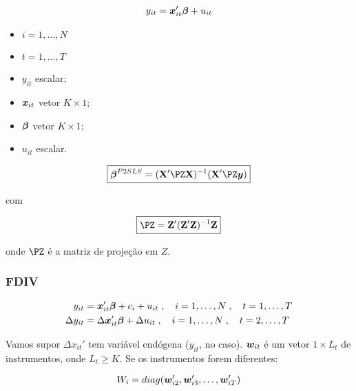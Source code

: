 \documentclass[11pt, oneside, a4paper, article]{article}
\numberwithin{equation}{section}
\begin{document}
\begin{description}
\vspace{-1 em}
\begin{align*}
y_{it} = \boldsymbol{x}_{it}' \boldsymbol{\beta} + u_{it}
\end{align*}

\begin{itemize}\itemsep0pt
\item $i = 1, \dots, N$
\item $t = 1, \dots, T$
\item $y_{it}$ escalar;
\item $\boldsymbol{x}_{it}$  vetor $K \times 1$;
\item $\boldsymbol{\beta}$ vetor $K \times 1$;
\item $u_{it}$ escalar.
\end{itemize}

\vspace{-1 em}
\begin{align*}
\boxed{
\betavec^{P2SLS} =  ( \Xmat' \PZ \Xmat )^{-1} ( \Xmat' \PZ \yvec ) }
\end{align*}

\noindent
com

\vspace{-1 em}
\begin{align*}
\boxed{\PZ = \Zmat'(\Zmat'\Zmat)^{-1}\Zmat }
\end{align*}

\noindent
onde
$\PZ$ é a matriz de projeção em $Z$.

\subsubsection{FDIV}

\vspace{-1 em}
\begin{align*}
y_{it} &= \boldsymbol{x}_{it}' \boldsymbol{\beta} + c_{i} + u_{it}
\; , \quad i = 1, \dots, N
\; , \quad t = 1, \dots, T
\\
\Delta y_{it} &= \Delta \boldsymbol{x}_{it}' \boldsymbol{\beta} + \Delta u_{it}
\; , \quad i = 1, \dots, N
\; , \quad t = 2, \dots, T
\end{align*}

Vamos supor $\Delta x_{it}'$ tem variável endógena ($y_{it}$, no caso).
$\boldsymbol{w}_{it}$ é um vetor $1 \times L_{t}$ de instrumentos, onde $L_{t} \geq K$.
Se os instrumentos forem diferentes:

\vspace{-1 em}
\begin{align*}
W_{i} = diag( \boldsymbol{w}_{i2}', \boldsymbol{w}_{i3}', \dots, \boldsymbol{w}_{iT}')
\end{align*}


\end{description}
\end{document}
